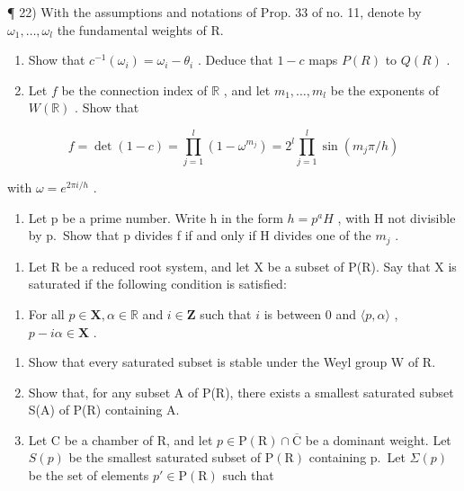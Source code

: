¶ 22) With the assumptions and notations of Prop. 33 of no. 11, denote by \(\omega_{1},\ldots,\omega_{l}\) the fundamental weights of R.

\begin{enumerate}
\def\labelenumi{\alph{enumi})}
\item
  Show that \(c^{-1}(\omega_i) = \omega_i - \theta_i\) . Deduce that \(1 - c\) maps \(P(R)\) to \(Q(R)\) .
\item
  Let \(f\) be the connection index of \(\mathbb{R}\) , and let \(m_1, \ldots, m_l\) be the exponents of \(W(\mathbb{R})\) . Show that
\end{enumerate}

\[
f = \det (1 - c) = \prod_ {j = 1} ^ {l} \left(1 - \omega ^ {m _ {j}}\right) = 2 ^ {l} \prod_ {j = 1} ^ {l} \sin \left(m _ {j} \pi / h\right)
\]

with \(\omega = e^{2\pi i/h}\) .

\begin{enumerate}
\def\labelenumi{\alph{enumi})}
\setcounter{enumi}{2}
\tightlist
\item
  Let p be a prime number. Write h in the form \(h = p^{a}H\) , with H not divisible by p.~Show that p divides f if and only if H divides one of the \(m_{j}\) .
\end{enumerate}

\begin{enumerate}
\def\labelenumi{\arabic{enumi})}
\setcounter{enumi}{22}
\tightlist
\item
  Let R be a reduced root system, and let X be a subset of P(R). Say that X is saturated if the following condition is satisfied:
\end{enumerate}

\begin{enumerate}
\def\labelenumi{(\Alph{enumi})}
\setcounter{enumi}{18}
\tightlist
\item
  For all \(p \in \mathbf{X}, \alpha \in \mathbb{R}\) and \(i \in \mathbf{Z}\) such that \(i\) is between 0 and \(\langle p, \alpha \rangle\) , \(p - i\alpha \in \mathbf{X}\) .
\end{enumerate}

\begin{enumerate}
\def\labelenumi{\alph{enumi})}
\item
  Show that every saturated subset is stable under the Weyl group W of R.
\item
  Show that, for any subset A of P(R), there exists a smallest saturated subset S(A) of P(R) containing A.
\item
  Let C be a chamber of R, and let \(p \in \mathrm{P}(\mathrm{R}) \cap \overline{\mathrm{C}}\) be a dominant weight. Let \(S(p)\) be the smallest saturated subset of \(\mathrm{P}(\mathrm{R})\) containing p.~Let \(\Sigma(p)\) be the set of elements \(p' \in \mathrm{P}(\mathrm{R})\) such that
\end{enumerate}

